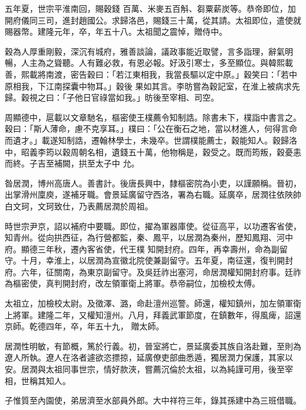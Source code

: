 \begin{pinyinscope}
 五年夏，世宗平淮南回，賜穀錢
 百萬、米麥五百斛、芻粟薪炭等。恭帝即位，加開府儀同三司，進封趙國公。求歸洛邑，賜錢三十萬，從其請。太祖即位，遣使就賜器幣。建隆元年，卒，年五十八。太祖聞之震悼，贈侍中。



 穀為人厚重剛毅，深沉有城府，雅善談論，議政事能近取譬，言多詣理，辭氣明暢，人主為之聳聽。人有難必救，有恩必報。好汲引寒士，多至顯位。與韓熙載善，熙載將南渡，密告穀曰：「若江東相我，我當長驅以定中原。」穀笑曰：「若中原相我，下江南探囊中物耳。」穀後
 果如其言。李昉嘗為穀記室，在淮上被病求先歸。穀視之曰：「子他日官祿當如我。」昉後至宰相、司空。



 周顯德中，扈載以文章馳名，樞密使王樸薦令知制誥。除書未下，樸詣中書言之。穀曰：「斯人薄命，慮不克享耳。」樸曰：「公在衡石之地，當以材進人，何得言命而遺才。」載遂知制誥，遷翰林學士，未幾卒。世謂樸能薦士，穀能知人。穀歸洛中，昭義李筠以穀周朝名相，遺錢五十萬，他物稱是，穀受之。既而筠叛，穀憂恚而終。子吉至補闕，拱至太子中
 允。



 昝居潤，博州高唐人。善書計。後唐長興中，隸樞密院為小吏，以謹願稱。晉初，出掌滑州廩庾，遂補牙職。會景延廣留守西洛，署為右職。延廣卒，居潤往依陜帥白文珂，文珂致仕，乃表薦居潤於周祖。



 時世宗尹京，詔以補府中要職。即位，擢為軍器庫使。從征高平，以功遷客省使，知青州。從向拱西征，為行營都監，秦、鳳平，以居潤為秦州，歷知鳳翔、河中府。顯德三年秋，遷內客省使，代王樸
 知開封府。四年，再幸壽州，命為副留守。十月，幸淮上，以居潤為宣徽北院使兼副留守。五年夏，南征還，復判開封府。六年，征關南，為東京副留守。及吳廷祚出塞河，命居潤權知開封府事。廷祚為樞密使，真判開封府，改左領軍衛上將軍。恭帝嗣位，加檢校太傅。



 太祖立，加檢校太尉。及徵澤、潞，命赴澶州巡警。師還，權知鎮州，加左領軍衛上將軍。建隆二年，又權知澶州。八月，拜義武軍節度，在鎮數年，得風痺，詔還京師。乾德四年，卒，年五十九，
 贈太師。



 居潤性明敏，有節概，篤於行義。初，晉室將亡，景延廣委其族自洛赴難，至則為遼人所執。遼人在洛者遽欲恣摽掠，延廣僚吏部曲悉遁，獨居潤力保護，其家以安。居潤與太祖同事世宗，情好款浹，嘗薦沉倫於太祖，以為純謹可用，後至宰相，世稱其知人。



 子惟質至內園使，弟居濟至水部員外郎。大中祥符三年，錄其孫建中為三班借職。




\end{pinyinscope}
